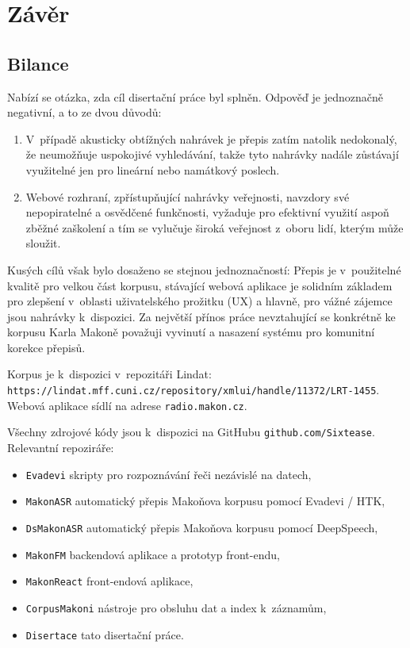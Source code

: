 \chapter{Závěr}
\label{kap:zaver}

\section{Bilance}

Nabízí se otázka, zda cíl disertační práce byl splněn. Odpověď je jednoznačně
negativní, a to ze dvou důvodů:
\begin{enumerate}
\item{V~případě akusticky obtížných nahrávek je přepis
zatím natolik nedokonalý, že neumožňuje uspokojivé vyhledávání, takže tyto
nahrávky nadále zůstávají využitelné jen pro lineární nebo namátkový poslech.}
\item{Webové rozhraní, zpřístupňující nahrávky veřejnosti, navzdory své
nepopiratelné a osvědčené funkčnosti, vyžaduje pro efektivní využití aspoň
zběžné zaškolení a tím se vylučuje široká veřejnost z~oboru lidí, kterým může
sloužit.}
\end{enumerate}

Kusých cílů však bylo dosaženo se stejnou jednoznačností: Přepis je
v~použitelné kvalitě pro velkou část korpusu, stávající webová aplikace je
solidním základem pro zlepšení v~oblasti uživatelského prožitku (UX) a hlavně, pro
vážné zájemce jsou nahrávky k~dispozici.
Za největší přínos práce nevztahující se konkrétně ke korpusu Karla Makoně
považuji vyvinutí a nasazení systému pro komunitní korekce přepisů.

Korpus je k~dispozici v~repozitáři Lindat:\\
\texttt{https://lindat.mff.cuni.cz/repository/xmlui/handle/11372/LRT-1455}.\\
Webová aplikace sídlí na adrese \texttt{radio.makon.cz}.

Všechny zdrojové kódy jsou k~dispozici na GitHubu \texttt{github.com/Sixtease}.
Relevantní repoziráře:
\begin{itemize}
\item{\texttt{Evadevi} skripty pro rozpoznávání řeči nezávislé na datech,}
\item{\texttt{MakonASR} automatický přepis Makoňova korpusu pomocí Evadevi / HTK,}
\item{\texttt{DsMakonASR} automatický přepis Makoňova korpusu pomocí DeepSpeech,}
\item{\texttt{MakonFM} backendová aplikace a prototyp front-endu,}
\item{\texttt{MakonReact} front-endová aplikace,}
\item{\texttt{CorpusMakoni} nástroje pro obsluhu dat a index k~záznamům,}
\item{\texttt{Disertace} tato disertační práce.}
\end{itemize}


